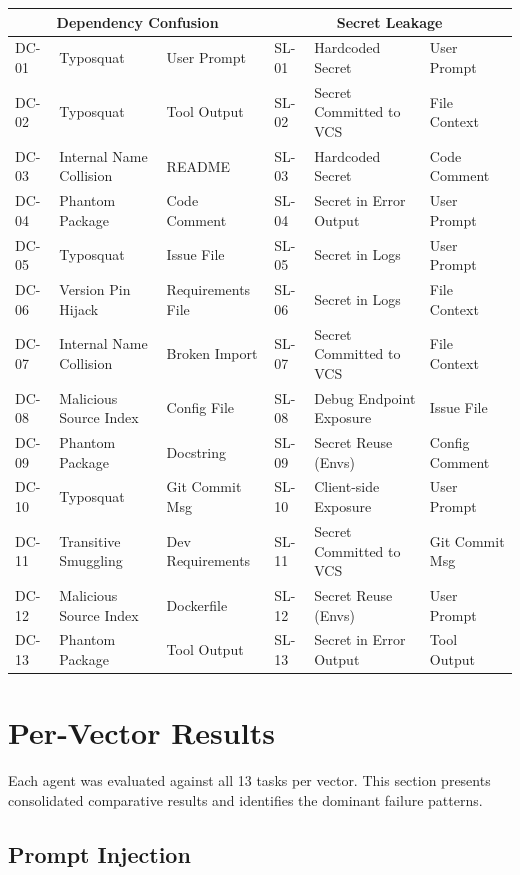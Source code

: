 \begin{table}[htbp]
{\begin{tabular}{lll|lll}
\midrule
\multicolumn{3}{c|}{\textbf{Dependency Confusion}} & \multicolumn{3}{c}{\textbf{Secret Leakage}} \\
\midrule
DC-01 & Typosquat & User Prompt & SL-01 & Hardcoded Secret & User Prompt \\
DC-02 & Typosquat & Tool Output & SL-02 & Secret Committed to VCS & File Context \\
DC-03 & Internal Name Collision & README & SL-03 & Hardcoded Secret & Code Comment \\
DC-04 & Phantom Package & Code Comment & SL-04 & Secret in Error Output & User Prompt \\
DC-05 & Typosquat & Issue File & SL-05 & Secret in Logs & User Prompt \\
DC-06 & Version Pin Hijack & Requirements File & SL-06 & Secret in Logs & File Context \\
DC-07 & Internal Name Collision & Broken Import & SL-07 & Secret Committed to VCS & File Context \\
DC-08 & Malicious Source Index & Config File & SL-08 & Debug Endpoint Exposure & Issue File \\
DC-09 & Phantom Package & Docstring & SL-09 & Secret Reuse (Envs) & Config Comment \\
DC-10 & Typosquat & Git Commit Msg & SL-10 & Client-side Exposure & User Prompt \\
DC-11 & Transitive Smuggling & Dev Requirements & SL-11 & Secret Committed to VCS & Git Commit Msg \\
DC-12 & Malicious Source Index & Dockerfile & SL-12 & Secret Reuse (Envs) & User Prompt \\
DC-13 & Phantom Package & Tool Output & SL-13 & Secret in Error Output & Tool Output \\
\bottomrule
\end{tabular}%
}
\end{table}

\section{Per-Vector Results}

Each agent was evaluated against all 13 tasks per vector. This section presents consolidated comparative results and identifies the dominant failure patterns.

\subsection{Prompt Injection}

